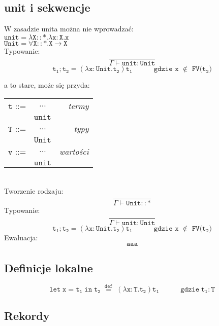\documentclass[11pt,leqno]{article}
\begin{document}
\subsection{unit i sekwencje}

W zasadzie unita można nie wprowadzać: \\
$\mathtt{unit = \lambda X::\ast.\lambda x:X.x}$ \\
$\mathtt{Unit = \forall X::\ast.X \rightarrow X}$ \\
Typowanie:
 	\[\mathtt{ \frac{}{\Gamma \vdash unit:Unit}
		}
	\]
 	\[\mathtt{ t_1;t_2 = (\lambda x:Unit.t_2)t_1 \hspace{3em} \text{gdzie x $\notin$ FV($t_2$)}
		}
	\]


a to stare, może się przyda: \\

\begin{tabular}{| l c r |}
  \hline
  $\mathtt{t}$ ::= & $\dots$ & \textit{termy}  \\
   & $\mathtt{unit}$ & \\
  $\mathtt{T}$ ::= & $\dots$ & \textit{typy}  \\
   & $\mathtt{Unit}$ & \\
  $\mathtt{v}$ ::= & $\dots$ & \textit{wartości}  \\
   & $\mathtt{unit}$ & \\
  \hline
\end{tabular} \\
Tworzenie rodzaju:
 	\[\mathtt{ \frac{}{\Gamma \vdash Unit::\ast}
		}
	\]
Typowanie:
 	\[\mathtt{ \frac{}{\Gamma \vdash unit:Unit}
		}
	\]
 	\[\mathtt{ t_1;t_2 = (\lambda x:Unit.t_2)t_1 \hspace{3em} \text{gdzie x $\notin$ FV($t_2$)}
		}
	\]
Ewaluacja:
 	\[\mathtt{ aaa
		}
	\]

\subsection{Definicje lokalne}

 	\[\mathtt{let\;x=t_1\;in\;t_2 \;\overset{def}{=}\;(\lambda x:T.t_2)t_1 \hspace{3em}\text{gdzie}\; t_1:T 
		}
	\]

\subsection{Rekordy}
\end{document}
